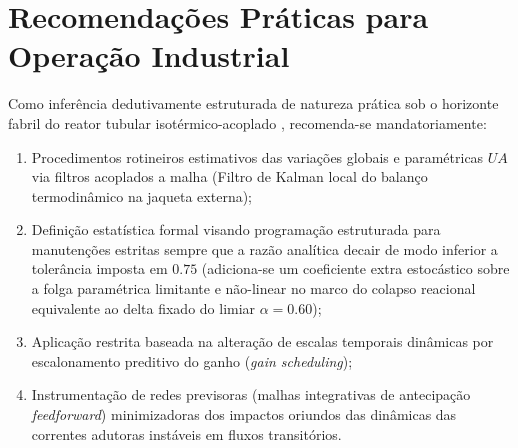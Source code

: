 \section{Recomendações Práticas para Operação Industrial}
\label{sec:recomendacoes_praticas}

Como inferência dedutivamente estruturada de natureza prática sob o horizonte fabril do reator tubular isotérmico-acoplado \cite{Bequette2003,Shinskey1996}, recomenda-se mandatoriamente:
\begin{enumerate}
    \item Procedimentos rotineiros estimativos das variações globais e paramétricas $UA$ via filtros acoplados a malha (Filtro de Kalman local do balanço termodinâmico na jaqueta externa);
    \item Definição estatística formal visando programação estruturada para manutenções estritas sempre que a razão analítica decair de modo inferior a tolerância imposta em $0.75$ (adiciona-se um coeficiente extra estocástico sobre a folga paramétrica limitante e não-linear no marco do colapso reacional equivalente ao delta fixado do limiar $\alpha = 0.60$);
    \item Aplicação restrita baseada na alteração de escalas temporais dinâmicas por escalonamento preditivo do ganho (\textit{gain scheduling});
    \item Instrumentação de redes previsoras (malhas integrativas de antecipação \textit{feedforward}) minimizadoras dos impactos oriundos das dinâmicas das correntes adutoras instáveis em fluxos transitórios.
\end{enumerate}
